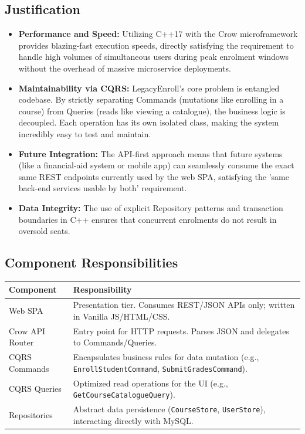 \documentclass[12pt,a4paper]{article}
\begin{document}
\subsection{Justification}
\begin{itemize}
    \item \textbf{Performance and Speed:} Utilizing C++17 with the Crow microframework provides blazing-fast execution speeds, directly satisfying the requirement to handle high volumes of simultaneous users during peak enrolment windows without the overhead of massive microservice deployments.
    \item \textbf{Maintainability via CQRS:} LegacyEnroll's core problem is entangled codebase. By strictly separating Commands (mutations like enrolling in a course) from Queries (reads like viewing a catalogue), the business logic is decoupled. Each operation has its own isolated class, making the system incredibly easy to test and maintain.
    \item \textbf{Future Integration:} The API-first approach means that future systems (like a financial-aid system or mobile app) can seamlessly consume the exact same REST endpoints currently used by the web SPA, satisfying the 'same back-end services usable by both' requirement.
    \item \textbf{Data Integrity:} The use of explicit Repository patterns and transaction boundaries in C++ ensures that concurrent enrolments do not result in oversold seats.
\end{itemize}

\subsection{Component Responsibilities}
\begin{table}[h]
\centering
\begin{tabular}{|p{4cm}|p{11cm}|}
\hline
\textbf{Component} & \textbf{Responsibility} \\
\hline
Web SPA & Presentation tier. Consumes REST/JSON APIs only; written in Vanilla JS/HTML/CSS. \\
\hline
Crow API Router & Entry point for HTTP requests. Parses JSON and delegates to Commands/Queries. \\
\hline
CQRS Commands & Encapsulates business rules for data mutation (e.g., \texttt{EnrollStudentCommand}, \texttt{SubmitGradesCommand}). \\
\hline
CQRS Queries & Optimized read operations for the UI (e.g., \texttt{GetCourseCatalogueQuery}). \\
\hline
Repositories & Abstract data persistence (\texttt{CourseStore}, \texttt{UserStore}), interacting directly with MySQL. \\
\hline
\end{tabular}
\end{table}
\end{document}
